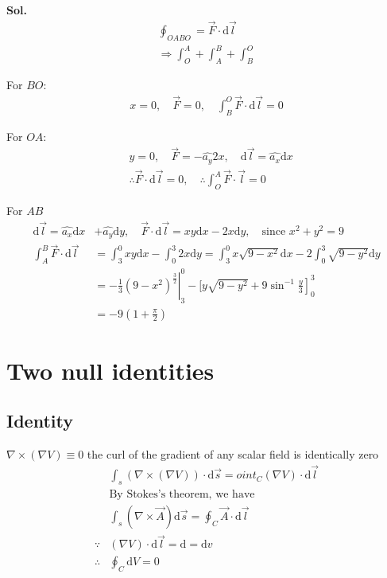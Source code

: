 \documentclass[12pt, a4paper]{article}
\begin{document}
\textbf{Sol.} \\
\begin{align*}
	\oint_{OABO} = \vec{F} \cdot \text{d} \vec{l} \\
	\Rightarrow \int_{O}^{A} + \int_{A}^{B} + \int_{B}^{O}
\end{align*}

For $BO$: 
\begin{align*}
	x = 0, \quad
	\vec{F} = 0, \quad
	\int_{B}^{O} \vec{F} \cdot \text{d} \vec{l} = 0
\end{align*}

For $OA$:
	\begin{align*}
	&y = 0, \quad
	\vec {F} = - \hat{a_y} 2x, \quad
	\text{d} \vec{l} = \hat{a_x} \text{d} x \\
	&\therefore \vec{F} \cdot \text{d} \vec{l} = 0, \quad
	\therefore \int_{O}^{A} \vec{F} \cdot \vec{l} = 0
\end{align*}

For $AB$
\begin{align*}
	\text{d} \vec{l} = \hat{a_x} \text{d}x &+ \hat{a_y} \text{d}y, \quad
	\vec{F} \cdot \text{d} \vec{l} = xy \text{d}x -2x \text{d}y, \quad
	\text{since } x^{2} + y^{2} = 9 \\
	\int_{A}^{B} \vec{F} \cdot \text{d} \vec{l}
	&= \int_{3}^{0} xy \text{d}x - \int_{0}^{3} 2x \text{d}y
	= \int_{3}^{0} x \sqrt{9-x^{2}} \text{d}x - 2\int_{0}^{3} \sqrt{9-y^2} \text{d}y \\
	&=\left. -\frac{1}{3}(9-x^2)^{\frac{3}{2}} \right|_3^0 - \left.[y \sqrt{9-y^2} + 9\sin^{-1}\frac{y}{3} \right]_0^3\\
	&= -9(1 + \frac{\pi}{2})
\end{align*}
\newpage

\section*{Two null identities}
\subsection*{Identity }
$\nabla \times (\nabla V) \equiv 0$ the curl of the gradient of any scalar field is identically zero \\
\begin{align*}
	&\int_{s} (\nabla \times (\nabla V)) \cdot \text{d} \vec{s} = oint_{C} (\nabla V) \cdot \text{d} \vec{l} \\ 
	&\text{By Stokes's theorem, we have} \\
	&\int_{s} (\nabla \times \vec{A}) \text{d} \vec{s} = \oint_{C} \vec {A} \cdot \text{d} \vec{l} \\
	\because &(\nabla V) \cdot \text{d} \vec{l} = \text{d} = \text{d} v \\
	\therefore &\oint_C \text{d} V = 0
\end{align*}
\end{document}
